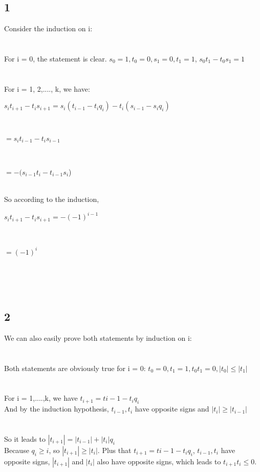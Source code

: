 \documentclass{article}
\begin{document}
\subsection{1}
Consider the induction on i:\\
\\ \hspace*{\fill} \\
For i = 0, the statement is clear. $s_0 = 1, t_0 = 0, s_1 = 0, t_1 = 1$, $s_0t_1 - t_0s_1 = 1$\\
\\ \hspace*{\fill} \\
For i = 1, 2,...., k, we have:\\
\centerline{$s_it_{i+1} - t_is_{i+1} = s_i(t_{i-1}-t_iq_i) - t_i(s_{i-1}-s_iq_i)$}\\
\centerline{$= s_it_{i-1} - t_is_{i-1}$}\\
\centerline{$= -(s_{i-1}t_i - t_{i-1}s_i$)}\\
So according to the induction, \\
\centerline{$s_it_{i+1} - t_is_{i+1} = -(-1)^{i-1}$}\\
\centerline{$= (-1)^i$}\\
\\ \hspace*{\fill} \\
\subsection{2}
We can also easily prove both statements by induction on i:\\
\\ \hspace*{\fill} \\
Both statements are obviously true for i = 0: $t_0 = 0, t_1 = 1, t_0t_1 = 0, |t_0| \leq |t_1|$\\
\\ \hspace*{\fill} \\
For i = 1,....,k, we have $t_{i+1} = t{i-1} - t_iq_i$\\
And by the induction hypothesis, $t_{i-1}, t_i$ have opposite signs and $|t_i| \geq |t_{i-1}|$\\
\\ \hspace*{\fill} \\
So it leads to $|t_{i+1}| = |t_{i-1}| + |t_i|q_i$\\
Because $q_i \geq i$, so $|t_{i+1}| \geq |t_i|$. Plus that $t_{i+1} = t{i-1} - t_iq_i$, $t_{i-1}, t_i$ have opposite signs, $|t_{i+1}|$ and  $|t_i|$ also have opposite signs, which leads to $t_{i+1}t_i \leq 0.$\\
\\ \hspace*{\fill} \\
\newpage
\end{document}
